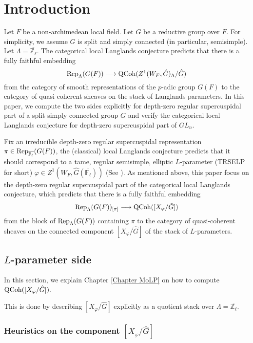 \chapter{Introduction}

Let $F$ be a non-archimedean local field. Let $G$ be a reductive group over $F$. For simplicity, we assume $G$ is split and simply connected (in particular, semisimple). Let $\Lambda=\overline{\mathbb{Z}_{\ell}}$. The categorical local Langlands conjecture predicts that there is a fully faithful embedding
$$\operatorname{\operatorname{Rep}}_{\Lambda}(G(F)) \longrightarrow \operatorname{\operatorname{QCoh}}(Z^1(W_F, \hat{G})_{\Lambda}/\hat{G})$$
from the category of smooth representations of the $p$-adic group $G(F)$ to the category of quasi-coherent sheaves on the stack of Langlands parameters. In this paper, we compute the two sides explicitly for depth-zero regular supercuspidal part of a split simply connected group $G$ and verify the categorical local Langlands conjecture for depth-zero supercuspidal part of $GL_n$.

Fix an irreducible depth-zero regular supercuspidal representation $\pi \in \operatorname{\operatorname{Rep}}_{\overline{\mathbb{F}_{\ell}}}(G(F))$, the (classical) local Langlands conjecture predicts that it should correspond to a tame, regular semisimple, elliptic $L$-parameter (TRSELP for short) $\varphi \in Z^1(W_F, \hat{G}(\overline{\mathbb{F}_{\ell}}))$ (See \cite{debacker2009depth}). As mentioned above, this paper focus on the depth-zero regular supercuspidal part of the categorical local Langlands conjecture, which predicts that there is a fully faithful embedding
$$\operatorname{\operatorname{Rep}}_{\Lambda}(G(F))_{[\pi]} \longrightarrow \operatorname{\operatorname{QCoh}}([X_{\varphi}/\hat{G}])$$
from the block of $\operatorname{\operatorname{Rep}}_{\Lambda}(G(F))$ containing $\pi$ to the category of quasi-coherent sheaves on the connected component $[X_{\varphi}/\hat{G}]$ of the stack of $L$-parameters.

\section{$L$-parameter side}
In this section, we explain Chapter \ref{Chapter MoLP} on how to compute $\operatorname{\operatorname{QCoh}}([X_{\varphi}/\hat{G}])$. 

This is done by describing $[X_{\varphi}/\hat{G}]$ explicitly as a quotient stack over $\Lambda=\overline{\mathbb{Z}_{\ell}}$. 

\subsection{Heuristics on the component $[X_{\varphi}/\hat{G}]$}

